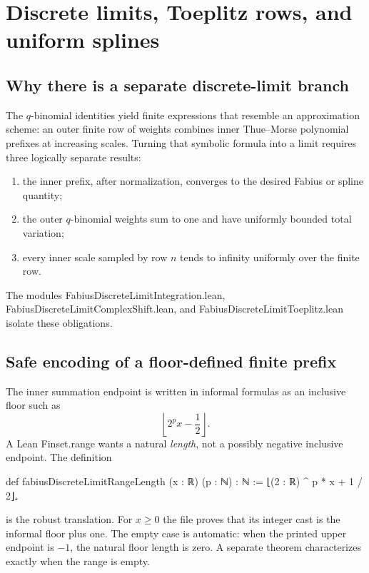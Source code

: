 \documentclass[11pt,a4paper,openany]{book}
\def\module#1{#1.lean}
\def\code#1{#1}
\newcommand{\module}[1]{\nolinkurl{#1.lean}}
\newcommand{\code}[1]{\texttt{\detokenize{#1}}}
\begin{document}
\chapter{Discrete limits, Toeplitz rows, and uniform splines}
\label{ch:discrete}

\section{Why there is a separate discrete-limit branch}
The $q$-binomial identities yield finite expressions that resemble an
approximation scheme: an outer finite row of weights combines inner
Thue--Morse polynomial prefixes at increasing scales.  Turning that symbolic
formula into a limit requires three logically separate results:
\begin{enumerate}
  \item the inner prefix, after normalization, converges to the desired Fabius
        or spline quantity;
  \item the outer $q$-binomial weights sum to one and have uniformly bounded
        total variation;
  \item every inner scale sampled by row $n$ tends to infinity uniformly over
        the finite row.
\end{enumerate}
The modules \module{FabiusDiscreteLimitIntegration},
\module{FabiusDiscreteLimitComplexShift}, and
\module{FabiusDiscreteLimitToeplitz} isolate these obligations.

\section{Safe encoding of a floor-defined finite prefix}
The inner summation endpoint is written in informal formulas as an inclusive
floor such as
\[
 \left\lfloor2^p x-\frac12\right\rfloor.
\]
A Lean \code{Finset.range} wants a natural \emph{length}, not a possibly
negative inclusive endpoint.  The definition

\begin{LeanCode}
def fabiusDiscreteLimitRangeLength (x : ℝ) (p : ℕ) : ℕ :=
  ⌊(2 : ℝ) ^ p * x + 1 / 2⌋₊
\end{LeanCode}

is the robust translation.  For $x\ge0$ the file proves that its integer cast
is the informal floor plus one.  The empty case is automatic: when the printed
upper endpoint is $-1$, the natural floor length is zero.  A separate theorem
characterizes exactly when the range is empty.
\end{document}
